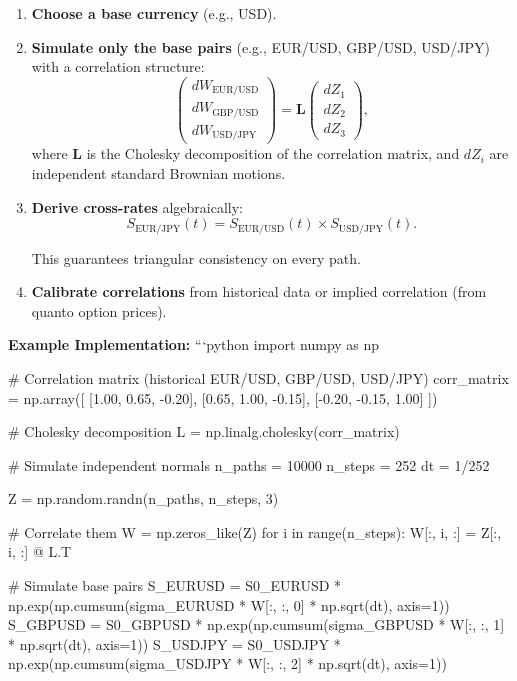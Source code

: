 \begin{enumerate}
	\item \textbf{Choose a base currency} (e.g., USD).
	
	\item \textbf{Simulate only the base pairs} (e.g., EUR/USD, GBP/USD, USD/JPY) with a correlation structure:
	\begin{equation}
		\begin{pmatrix} dW_{\text{EUR/USD}} \\ dW_{\text{GBP/USD}} \\ dW_{\text{USD/JPY}} \end{pmatrix} = \mathbf{L} \begin{pmatrix} dZ_1 \\ dZ_2 \\ dZ_3 \end{pmatrix},
	\end{equation}
	where $\mathbf{L}$ is the Cholesky decomposition of the correlation matrix, and $dZ_i$ are independent standard Brownian motions.
	
	\item \textbf{Derive cross-rates} algebraically:
	\begin{equation}
		S_{\text{EUR/JPY}}(t) = S_{\text{EUR/USD}}(t) \times S_{\text{USD/JPY}}(t).
	\end{equation}
	
	This guarantees triangular consistency on every path.
	
	\item \textbf{Calibrate correlations} from historical data or implied correlation (from quanto option prices).
\end{enumerate}

\textbf{Example Implementation:}
```python
import numpy as np

# Correlation matrix (historical EUR/USD, GBP/USD, USD/JPY)
corr_matrix = np.array([
[1.00, 0.65, -0.20],
[0.65, 1.00, -0.15],
[-0.20, -0.15, 1.00]
])

# Cholesky decomposition
L = np.linalg.cholesky(corr_matrix)

# Simulate independent normals
n_paths = 10000
n_steps = 252
dt = 1/252

Z = np.random.randn(n_paths, n_steps, 3)

# Correlate them
W = np.zeros_like(Z)
for i in range(n_steps):
W[:, i, :] = Z[:, i, :] @ L.T

# Simulate base pairs
S_EURUSD = S0_EURUSD * np.exp(np.cumsum(sigma_EURUSD * W[:, :, 0] * np.sqrt(dt), axis=1))
S_GBPUSD = S0_GBPUSD * np.exp(np.cumsum(sigma_GBPUSD * W[:, :, 1] * np.sqrt(dt), axis=1))
S_USDJPY = S0_USDJPY * np.exp(np.cumsum(sigma_USDJPY * W[:, :, 2] * np.sqrt(dt), axis=1))

